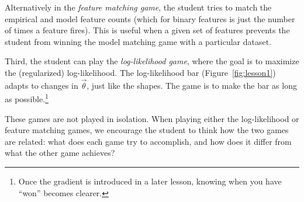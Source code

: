 \documentclass[11pt,letterpaper]{article}
\newcommand{\Note}[1]{}
\renewcommand{\Note}[1]{\hl{[#1]}}  %
\newcommand{\NoteSigned}[3]{{\sethlcolor{#2}\Note{#1: #3}}}
\newcommand{\NoteFF}[1]{\NoteSigned{FF}{LightBlue}{#1}}
\begin{document}
Alternatively in the \textit{feature matching game}, the student tries to match the empirical and 
model feature counts (which for binary features is just the number of times a feature fires).
This is useful when a given set of features prevents the student from winning the model 
matching game with a particular dataset.

Third, the student can play the \textit{log-likelihood game}, where the goal is to
maximize the (regularized) log-likelihood. The log-likelihood
bar (Figure~\ref{fig:lesson1}) adapts to changes in $\vec{\theta}$,
just like the shapes. The game is to make the bar as 
long as possible.\footnote{Once the gradient is introduced in a later lesson, knowing when you have ``won'' becomes clearer.}

These games are not played in isolation. When playing either the log-likelihood or 
feature matching games, we encourage the student to think how the two games are related: what 
does each game try to accomplish, and how does it differ from what the other game achieves?
\end{document}
